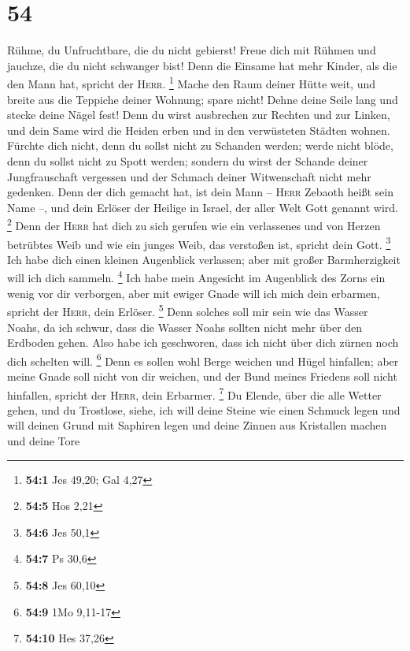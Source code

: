 \hypertarget{section-20}{%
\section{54}\label{section-20}}

 Rühme, du Unfruchtbare, die du nicht gebierst! Freue dich
mit Rühmen und jauchze, die du nicht schwanger bist! Denn die Einsame
hat mehr Kinder, als die den Mann hat, spricht der \textsc{Herr}.
\footnote{\textbf{54:1} Jes 49,20; Gal 4,27}  Mache den
Raum deiner Hütte weit, und breite aus die Teppiche deiner Wohnung;
spare nicht! Dehne deine Seile lang und stecke deine Nägel fest!
 Denn du wirst ausbrechen zur Rechten und zur Linken, und
dein Same wird die Heiden erben und in den verwüsteten Städten wohnen.
 Fürchte dich nicht, denn du sollst nicht zu Schanden
werden; werde nicht blöde, denn du sollst nicht zu Spott werden; sondern
du wirst der Schande deiner Jungfrauschaft vergessen und der Schmach
deiner Witwenschaft nicht mehr gedenken.  Denn der dich
gemacht hat, ist dein Mann -- \textsc{Herr} Zebaoth heißt sein Name --,
und dein Erlöser der Heilige in Israel, der aller Welt Gott genannt
wird. \footnote{\textbf{54:5} Hos 2,21}  Denn der
\textsc{Herr} hat dich zu sich gerufen wie ein verlassenes und von
Herzen betrübtes Weib und wie ein junges Weib, das verstoßen ist,
spricht dein Gott. \footnote{\textbf{54:6} Jes 50,1}  Ich
habe dich einen kleinen Augenblick verlassen; aber mit großer
Barmherzigkeit will ich dich sammeln. \footnote{\textbf{54:7} Ps 30,6}
 Ich habe mein Angesicht im Augenblick des Zorns ein wenig
vor dir verborgen, aber mit ewiger Gnade will ich mich dein erbarmen,
spricht der \textsc{Herr}, dein Erlöser. \footnote{\textbf{54:8} Jes
  60,10}  Denn solches soll mir sein wie das Wasser Noahs,
da ich schwur, dass die Wasser Noahs sollten nicht mehr über den
Erdboden gehen. Also habe ich geschworen, dass ich nicht über dich
zürnen noch dich schelten will. \footnote{\textbf{54:9} 1Mo 9,11-17}
 Denn es sollen wohl Berge weichen und Hügel hinfallen;
aber meine Gnade soll nicht von dir weichen, und der Bund meines
Friedens soll nicht hinfallen, spricht der \textsc{Herr}, dein Erbarmer.
\footnote{\textbf{54:10} Hes 37,26}  Du Elende, über die
alle Wetter gehen, und du Trostlose, siehe, ich will deine Steine wie
einen Schmuck legen und will deinen Grund mit Saphiren legen
 und deine Zinnen aus Kristallen machen und deine Tore
